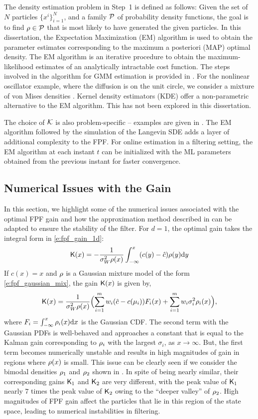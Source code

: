 The density estimation problem in Step~1 is defined as follows: Given the set of $N$ particles $\{x^i\}_{i=1}^N$, and a family ${\cal P} $ of probability density functions,  the goal is to find $\rho \in {\cal P} $ that is most likely to have generated the given particles.  In this dissertation, the Expectation Maximization (EM) algorithm is used to obtain the parameter estimates corresponding to the maximum a posteriori (MAP) optimal density. The EM algorithm is an iterative procedure to obtain the maximum-likelihood estimates of an analytically intractable cost function. The steps involved in the algorithm for GMM estimation is provided in . For the nonlinear oscillator example, where the diffusion is on the unit circle, we consider a mixture of von Mises densities \cite{haspea00}. Kernel density estimators (KDE) offer a non-parametric alternative to the EM algorithm. This has not been explored in this dissertation. 

The choice of ${\cal K}$ is also problem-specific -- examples are given in . The EM algorithm followed by the simulation of the Langevin SDE adds a layer of additional complexity to the FPF. For online estimation in a filtering setting, the EM algorithm at each instant $t$ can be initialized with the ML parameters obtained from the previous instant for faster convergence.   

\subsection{Numerical Issues with the Gain}
\label{s:fpf_numerical}
In this section, we highlight some of the numerical issues associated with the optimal FPF gain and how the approximation method described in  can be adapted to ensure the stability of the filter. For $d=1$, the optimal gain takes the integral form in \eqref{e:fpf_gain_1d}:
\[
\text{\sf K}(x) = - \frac{1}{\sigma_W^2 \rho(x)} \int_{-\infty}^{x} (c(y) - \hat{c}) \rho(y) \text{d} y
\]
If $c(x) = x$ and $\rho$ is a Gaussian mixture model of the form \eqref{e:fpf_gaussian_mix}, the gain $\text{\sf K}(x)$ is given by,
\begin{equation}
\kFPF(x) = \frac{1}{\sigma^2_W \pr(x)} \Bigl( \sum_{i=1}^m w_i (\hac - c(\mu_i)) F_i(x) + \sum_{i=1}^m w_i\sigma^2_i \pr_i(x)\Bigr),
\label{e:fpf_gain_gmm}
\end{equation}
where $F_i = \int_{-\infty}^{x} \rho_i(x) \text{d} x$ is the Gaussian CDF. The second term with the Gaussian PDFs is well-behaved and approaches a constant that is equal to the Kalman gain corresponding to $\rho_i$ with the largest $\sigma_i$, as $x \to \infty$. But, the first term becomes numerically unstable and results in high magnitudes of gain in regions where $\rho(x)$ is small. This issue can be clearly seen if we consider the bimodal densities $\rho_1$ and $\rho_2$ shown in . In spite of being nearly similar, their corresponding gains $\text{\sf K}_1$ and $\text{\sf K}_2$ are very different, with the peak value of $\text{\sf K}_1$ nearly $7$ times the peak value of $\text{\sf K}_2$ owing to the ``deeper valley'' of $\rho_2$. High magnitudes of FPF gain affect the particles that lie in this region of the state space, leading to numerical instabilities in filtering.

